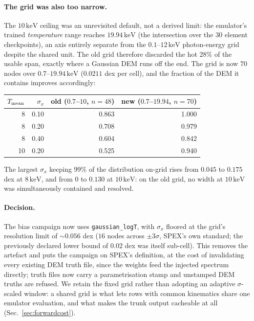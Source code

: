 \documentclass[11pt,a4paper]{article}
\newcommand{\kev}{\,\mathrm{keV}}
\newcommand{\code}[1]{\texttt{#1}}
\begin{document}
\paragraph{The grid was also too narrow.} The $10\kev$ ceiling was an
unrevisited default, not a derived limit: the emulator's trained
\emph{temperature} range reaches $19.94\kev$ (the intersection over the 30
element checkpoints), an axis entirely separate from the $0.1$--$12\kev$
photon-energy grid despite the shared unit. The old grid therefore discarded
the hot $28\%$ of the usable span, exactly where a Gaussian DEM runs off the
end. The grid is now $70$ nodes over $0.7$--$19.94\kev$ ($0.0211$ dex per
cell), and the fraction of the DEM it contains improves accordingly:
\begin{center}
\begin{tabular}{rrrr}
\toprule
$T_{\rm mean}$ & $\sigma_x$ & old ($0.7$--$10$, $n{=}48$) & new ($0.7$--$19.94$, $n{=}70$) \\
\midrule
 8 & 0.10 & 0.863 & 1.000 \\
 8 & 0.20 & 0.708 & 0.979 \\
 8 & 0.40 & 0.604 & 0.842 \\
10 & 0.20 & 0.525 & 0.940 \\
\bottomrule
\end{tabular}
\end{center}
The largest $\sigma_x$ keeping $99\%$ of the distribution on-grid rises from
$0.045$ to $0.175$ dex at $8\kev$, and from $0$ to $0.130$ at $10\kev$: on the
old grid, no width at $10\kev$ was simultaneously contained and resolved.

\paragraph{Decision.} The bias campaign now uses \code{gaussian\_logT}, with
$\sigma_x$ floored at the grid's resolution limit of ${\sim}0.056$ dex ($16$
nodes across $\pm3\sigma$, SPEX's own standard; the previously declared lower
bound of $0.02$ dex was itself sub-cell). This removes the artefact and puts the
campaign on SPEX's definition, at the cost of invalidating every existing DEM
truth file, since the weights feed the injected spectrum directly; truth files
now carry a parametrisation stamp and unstamped DEM truths are refused. We
retain the fixed grid rather than adopting an adaptive $\sigma$-scaled window: a
shared grid is what lets rows with common kinematics share one emulator
evaluation, and what makes the trunk output cacheable at all
(Sec.~\ref{sec:forwardcost}).
\end{document}
